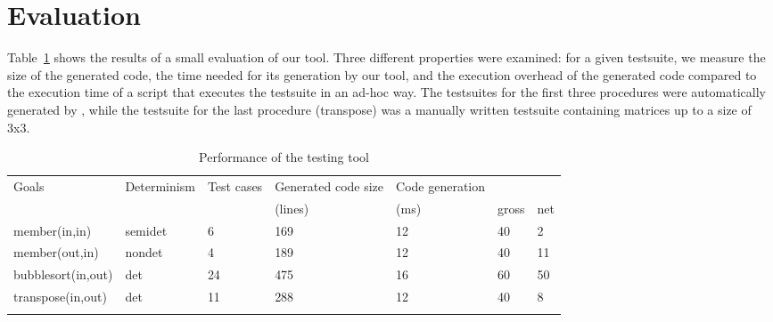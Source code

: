 \documentclass[british]{llncs}
\providecommand{\tabularnewline}{\\}
\begin{document}
\section{Evaluation}\label{eval}

Table~\ref{tab:Performance-testing} shows the results of a small evaluation of our tool.
Three different properties were examined: for a given testsuite, we measure the size of the generated code, the time needed for its generation by our tool, and the execution overhead of the generated code compared to the execution time of a script that executes the testsuite in an ad-hoc way. The testsuites for the first three procedures were automatically generated by \cite{DBLP:conf/lopstr/DegraveSV08}, while the testsuite for the last procedure (transpose) was a manually written testsuite containing matrices up to a size of 3x3.


\begin{table}[h]
\centering{}\begin{tabular}{|l||>{\centering}p{0.8in}|>{\centering}p{0.4in}|>{\centering}p{0.7in}|>{\centering}p{0.7in}|>{\centering}p{0.4in}|>{\centering}p{0.4in}|}
\hline 
{\scriptsize Goals} & {\scriptsize Determinism} & {\scriptsize Test cases} & {\scriptsize Generated code size } & {\scriptsize Code generation} & \multicolumn{2}{c|}{{\scriptsize Execution (ns)}}\tabularnewline
\cline{6-7} 
 &  &  & {\scriptsize (lines)} & {\scriptsize (ms)} & {\scriptsize gross} & {\scriptsize net}\tabularnewline
\hline
\hline 
{\scriptsize member(in,in)} & {\scriptsize semidet} & {\scriptsize 6} & {\scriptsize 169} & {\scriptsize 12} & {\scriptsize 40} & {\scriptsize 2}\tabularnewline
\hline 
{\scriptsize member(out,in)} & {\scriptsize nondet} & {\scriptsize 4} & {\scriptsize 189} & {\scriptsize 12} & {\scriptsize 40} & {\scriptsize 11}\tabularnewline
\hline 
{\scriptsize bubblesort(in,out)} & {\scriptsize det} & {\scriptsize 24} & {\scriptsize 475} & {\scriptsize 16} & {\scriptsize 60} & {\scriptsize 50}\tabularnewline
\hline 
{\scriptsize transpose(in,out)} & {\scriptsize det} & {\scriptsize 11} & {\scriptsize 288} & {\scriptsize 12} & {\scriptsize 40} & {\scriptsize 8}\tabularnewline
\hline 
\multicolumn{1}{l}{} & \multicolumn{1}{>{\centering}p{0.8in}}{} & \multicolumn{1}{>{\centering}p{0.4in}}{} & \multicolumn{1}{>{\centering}p{0.7in}}{} & \multicolumn{1}{>{\centering}p{0.7in}}{} & \multicolumn{1}{>{\centering}p{0.4in}}{} & \multicolumn{1}{>{\centering}p{0.4in}}{}\tabularnewline
\end{tabular}\caption{\label{tab:Performance-testing}Performance of the testing tool}
\end{table}
\end{document}
